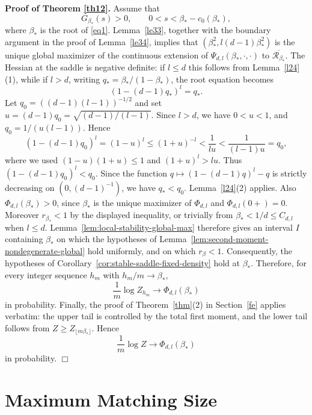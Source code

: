 \documentclass[11pt]{amsart}
\theoremstyle{plain}
\numberwithin{equation}{section}
\numberwithin{theorem}{section}
\numberwithin{figure}{section}
\begin{document}
\bigskip
\noindent\textbf{Proof of Theorem \ref{th12}.}
Assume that
\[
  G_{\beta_*}(s)>0,
  \qquad 0<s<\beta_*-c_0(\beta_*),
\]
where \(\beta_*\) is the root of \eqref{eq1}.  Lemma~\ref{le33}, together with
the boundary argument in the proof of Lemma~\ref{le34}, implies that
\((\beta_*^2,l(d-1)\beta_*^2)\) is the unique global maximizer of the continuous
extension of \(\Psi_{d,l}(\beta_*,\cdot,\cdot)\) to
\(\overline{\mathcal R_{\beta_*}}\).  The Hessian at the saddle is negative definite:
if \(l\le d\) this follows from Lemma~\ref{l24}(1), while
if \(l>d\), writing \(q_*=\beta_*/(1-\beta_*)\), the root equation becomes
\[
  (1-(d-1)q_*)^l=q_*.
\]
Let \(q_0=((d-1)(l-1))^{-1/2}\) and set
\(u=(d-1)q_0=\sqrt{(d-1)/(l-1)}\).  Since \(l>d\), we have \(0<u<1\),
and \(q_0=1/(u(l-1))\).  Hence
\[
  (1-(d-1)q_0)^l=(1-u)^l
  \le (1+u)^{-l}<\frac1{lu}<\frac1{(l-1)u}=q_0,
\]
where we used \((1-u)(1+u)\le1\) and \((1+u)^l>lu\).  Thus
\((1-(d-1)q_0)^l<q_0\).  Since the function
\(q\mapsto (1-(d-1)q)^l-q\) is strictly decreasing on
\((0,(d-1)^{-1})\), we have \(q_*<q_0\).  Lemma~\ref{l24}(2) applies.  Also
\(\Phi_{d,l}(\beta_*)>0\), since \(\beta_*\) is the unique maximizer of
\(\Phi_{d,l}\) and \(\Phi_{d,l}(0+)=0\).
Moreover \(r_{\beta_*}<1\) by the displayed inequality, or trivially from
\(\beta_*<1/d\le C_{d,l}\) when \(l\le d\).  Lemma~\ref{lem:local-stability-global-max}
therefore gives an interval \(I\) containing \(\beta_*\) on which the hypotheses of
Lemma~\ref{lem:second-moment-nondegenerate-global} hold uniformly, and on which
\(r_\beta<1\).  Consequently, the hypotheses of
Corollary~\ref{cor:stable-saddle-fixed-density} hold at \(\beta_*\).  Therefore,
for every integer sequence \(h_m\) with \(h_m/m\to\beta_*\),
\[
  \frac1m\log Z_{h_m}\longrightarrow \Phi_{d,l}(\beta_*)
\]
in probability.  Finally, the proof of Theorem~\ref{thm}(2) in Section~\ref{fe}
applies verbatim:
the upper tail is controlled by the total first moment, and the lower tail follows
from \(Z\ge Z_{\lfloor m\beta_*\rfloor}\).  Hence
\[
  \frac1m\log Z\longrightarrow \Phi_{d,l}(\beta_*)
\]
in probability.
\hfill\(\Box\)




\section{Maximum Matching Size}\label{mm}
\end{document}
